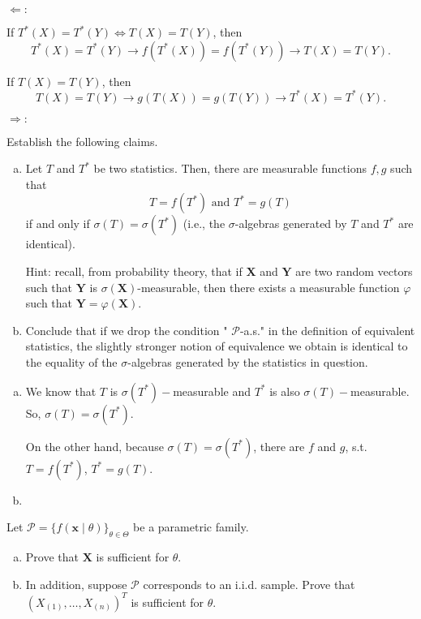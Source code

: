 \begin{solution}
    $\Leftarrow: $

    If $T^*(X)=T^*(Y)\Leftrightarrow T(X)=T(Y)$, then
    \[
        T^*(X)=T^*(Y)\rightarrow f(T^*(X))=f(T^*(Y))\rightarrow T(X)=T(Y). 
    \]

    If $T(X)=T(Y)$, then
    \[
        T(X)=T(Y)\rightarrow g(T(X))=g(T(Y))\rightarrow T^*(X)=T^*(Y). 
    \]

    $\Rightarrow: $
\end{solution}

\begin{exercise}
    Establish the following claims. 
    \begin{enumerate}[(a)]
        \item Let \(T\) and \(T^{*}\) be two statistics. Then, there are measurable functions \(f, g\) such that 
        \[
            T=f\left(T^{*}\right)\text{ and }T^{*}=g(T)
        \]
        if and only if \(\sigma(T)=\sigma\left(T^{*}\right)\)
        (i.e., the \(\sigma\)-algebras generated by \(T\) and \(T^{*}\) are identical). 
        
        Hint: recall, from probability theory, that if \(\mathbf{X}\) and \(\mathbf{Y}\) are two random vectors such that \(\mathbf{Y}\) is \(\sigma(\mathbf{X})\)-measurable, then there exists a measurable function \(\varphi\) such that \(\mathbf{Y}=\varphi(\mathbf{X})\). 
        \item Conclude that if we drop the condition " \(\mathcal{P}\)-a.s." in the definition of equivalent statistics, the slightly stronger notion of equivalence we obtain is identical to the equality of the \(\sigma\)-algebras generated by the statistics in question. 
    \end{enumerate}
\end{exercise}

\begin{solution}
    \begin{enumerate}[(a)]
        \item We know that $T$ is $\sigma(T^*)-$measurable and $T^*$ is also $\sigma(T)-$measurable. So, $\sigma(T)=\sigma(T^*)$. 
        
        On the other hand, because $\sigma(T)=\sigma(T^*)$, there are $f$ and $g$, s.t. $T=f(T^*)$, $T^*=g(T)$. 
        \item 
    \end{enumerate}
\end{solution}

\begin{exercise}
    Let \(\mathcal{P}=\{f(\mathbf{x} \mid \theta)\}_{\theta \in \Theta}\) be a parametric family. 
    \begin{enumerate}[(a)]
        \item Prove that \(\mathbf{X}\) is sufficient for \(\theta\). 
        \item In addition, suppose \(\mathcal{P}\) corresponds to an i.i.d. sample. Prove that \(\left(X_{(1)}, \ldots, X_{(n)}\right)^T\) is sufficient for \(\theta\). 
    \end{enumerate}
\end{exercise}

